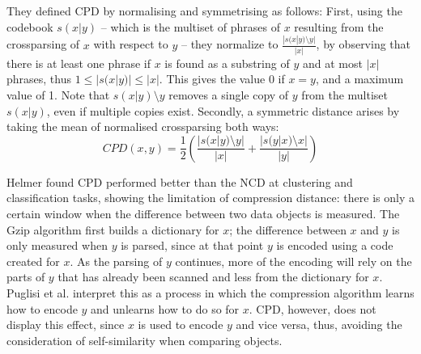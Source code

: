 
They defined CPD by normalising and symmetrising as follows:  First, using the codebook $s(x|y)$ -- which is the multiset of phrases of $x$ resulting from the crossparsing of $x$ with respect to $y$ -- they normalize to $\frac{|s(x|y) \setminus {y}|}{|x|}$, by observing that there is at least one phrase if $x$ is found as a substring of $y$ and at most $|x|$ phrases, thus $1 \leq |s(x|y)| \leq |x|$. This gives the value 0 if $x = y$, and a maximum value of 1. Note that $s(x|y) \setminus {y}$ removes a single copy of $y$ from the multiset $s(x|y)$, even if multiple copies exist. Secondly, a symmetric distance arises by taking the mean of normalised crossparsing both ways:
\begin{equation}
CPD(x, y) = \frac{1}{2}\left(\frac{|s(x|y) \setminus {y}|}{|x|} + \frac{|s(y|x) \setminus {x}|}{|y|}\right)
\end{equation}

Helmer found CPD performed better than the NCD at clustering and classification tasks, showing the limitation of compression distance: there is only a certain window when the difference between two data objects is measured. The Gzip algorithm first builds a dictionary for $x$; the difference between $x$ and $y$ is only measured when $y$ is parsed, since at that point $y$ is encoded using a code created for $x$. As the parsing of $y$ continues, more of the encoding will rely on the parts of $y$ that has already been scanned and less from the dictionary for $x$. Puglisi et al. \cite{} interpret this as a process in which the compression algorithm learns how to encode $y$ and unlearns how to do so for $x$. CPD, however, does not display this effect, since $x$ is used to encode $y$ and vice versa, thus, avoiding the consideration of self-similarity when comparing objects.

